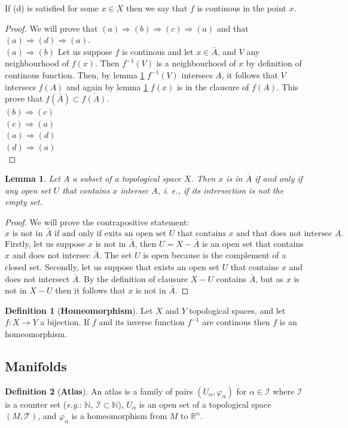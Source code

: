 \documentclass[10pt, letterpaper, oneside]{book}
\theoremstyle{theorem} %
\theoremstyle{theorem} %
\newtheorem{lemma}{Lemma}%
\theoremstyle{definition}
\newtheorem{definition}{Definition}%
\theoremstyle{remark}
\theoremstyle{definition}
\theoremstyle{definition}
\theoremstyle{theorem}
\def\Re{\mathbb{R}}
\def\ble{\begin{lemma}}
\def\ele{\end{lemma}}
\def\bde{\begin{definition}}
\def\ede{\end{definition}}
\def\bpr{\begin{proof}}
\def\epr{\end{proof}}
\renewcommand{\implies}{\Rightarrow}
\begin{document}
If (d) is satisfied for some $x\in X$ then we say that $f$ is continous in the point $x$.

\bpr
We will prove that $(a)\implies (b)\implies (c)\implies (a)$ and that $(a) \implies (d) \implies (a)$.\\ 

$(a)\implies (b)$ Let us suppose $f$ is continous and let $x\in\bar{A}$, and $V$ any neighbourhood of $f(x)$. Then $f^{-1}(V)$ is a neighbourhood of $x$ by definition of continous function. Then, by lemma \ref{lemma:clausure} $f^{-1}(V)$ intersecs $A$, it follows that $V$ intersecs $f(A)$ and again by lemma \ref{lemma:clausure} $f(x)$ is in the clausure of $f(A)$. This prove that $f(\bar{A}) \subset \overline{f(A)}$.\\

$(b)\implies (c)$ \\

$(c)\implies (a)$ \\ 

$(a)\implies (d)$ \\ 

$(d)\implies (a)$ \\ 
\epr

\ble
\label{lemma:clausure}
\rm
Let $A$ a subset of a topological space $X$. Then $x$ is in $\bar{A}$ if and only if any open set $U$ that contains $x$ intersec $A$, i. e., if its intersection is not the empty set.
\ele

\bpr We will prove the contrapositive statement:
$$ x \text{ is not in } \bar{A} \text{ if and only if exits an open set } U \text{ that contains } x \text{ and that does not intersec } A. $$
Firstly, let us suppose $x$ is not in $\bar{A}$, then $U=X-\bar{A}$ is an open set that contains $x$ and does not intersec $\bar{A}$. The set $U$ is open because is the complement of a closed set. Secondly, let us suppose that exists an open set $U$ that contains $x$ and does not intersect $\bar{A}$. By the definition of clausure $X-U$ contains $\bar{A}$, but as $x$ is not in $X-U$ then it follows that $x$ is not in $\bar{A}$.

\epr

\bde[\bf Homeomorphism]
Let $X$ and $Y$ topological spaces, and let $f:X\to Y$ a bijection. If $f$ and its inverse function $f^{-1}$ are continous then $f$ is an homeomorphism.
\ede

\subsection*{Manifolds}
\bde[\bf Atlas] An atlas is a family of pairs $(U_\alpha,\varphi_\alpha)$ for $\alpha\in \mathscr{I}$ where $\mathscr{I}$ is a counter set (\textit{e.g.}: $\mathbb{N}$, $\mathscr{I}\subset\mathbb{N}$), $U_\alpha$ is an open set of a topological space $(M,\mathscr{T})$, and $\varphi_\alpha$ is a homeomorphism from $M$ to $\Re^n$. 
\ede
\end{document}
